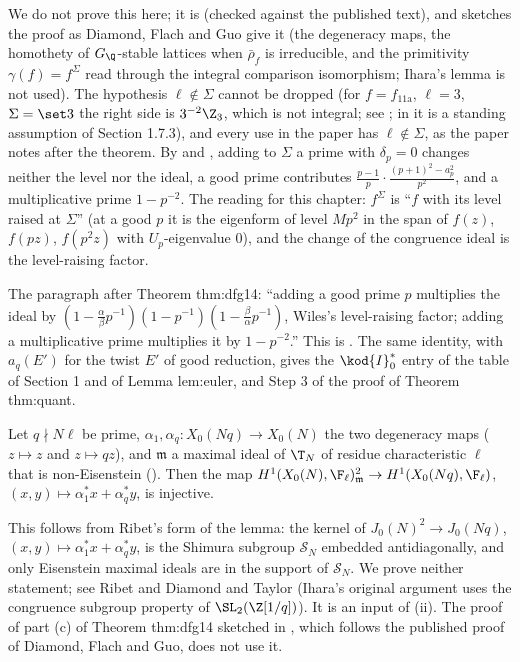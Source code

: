 We do not prove this here; it is \cite[Proposition 1.4(c)]{DFG04} (checked against the published text), and  sketches the proof as Diamond, Flach and Guo give it
(the degeneracy maps, the homothety of $G_\Q$-stable lattices when $\bar\rho_f$ is irreducible, and the primitivity $\gamma(f)=f^\Sigma$ read through the integral comparison isomorphism; Ihara's
lemma is not used). The hypothesis
$\ell\notin\Sigma$ cannot be dropped (for $f=f_{\text{11a}}$, $\ell=3$, $\Sigma=\set3$ the right side is $3^{-2}\Z_3$, which is not integral; see ; in \cite{DFG04} it is a standing assumption of Section 1.7.3), and
every use in the paper has $\ell\notin\Sigma$, as the paper notes after the theorem. By  and , adding to $\Sigma$ a prime with $\delta_p=0$ changes neither the level nor
the ideal, a good prime contributes $\frac{p-1}p\cdot\frac{(p+1)^2-a_p^2}{p^2}$, and a multiplicative prime $1-p^{-2}$. The reading for this chapter: $f^\Sigma$ is ``$f$ with its level
raised at $\Sigma$'' (at a good $p$ it is the eigenform of level $Mp^2$ in the span of $f(z)$, $f(pz)$, $f(p^2z)$ with $U_p$-eigenvalue $0$), and the change of the
congruence ideal is the level-raising factor.

\begin{paperlink}
The paragraph after Theorem thm:dfg14: ``adding a good prime $p$ multiplies the ideal by $(1-\frac\alpha\beta p^{-1})(1-p^{-1})(1-\frac\beta\alpha p^{-1})$, Wiles's level-raising
factor; adding a multiplicative prime multiplies it by $1-p^{-2}$.'' This is . The same identity, with $a_q(E')$ for the
twist $E'$ of good reduction, gives the $\kod{I}_0^*$ entry of the table of Section 1 and of Lemma lem:euler, and Step 3 of the proof of Theorem thm:quant.
\end{paperlink}

\begin{lemma}\label{lem:modgalrep:ihara}
Let $q\nmid N\ell$ be prime, $\alpha_1,\alpha_q\colon X_0(Nq)\to X_0(N)$ the two degeneracy maps ($z\mapsto z$ and $z\mapsto qz$), and $\mathfrak m$ a maximal ideal of $\T_N$ of residue
characteristic $\ell$ that is non-Eisenstein (). Then the map $H^1(X_0(N),\F_\ell)^2_{\mathfrak m}\to H^1(X_0(Nq),\F_\ell)$, $(x,y)\mapsto\alpha_1^*x+\alpha_q^*y$, is
injective.
\end{lemma}

This follows from Ribet's form of the lemma: the kernel of $J_0(N)^2\to J_0(Nq)$, $(x,y)\mapsto\alpha_1^*x+\alpha_q^*y$, is the Shimura subgroup $\mathcal S_N$ embedded
antidiagonally, and only Eisenstein maximal ideals are in the support of $\mathcal S_N$. We prove neither statement; see Ribet \cite{Ribet84} and Diamond and Taylor \cite{DiamondTaylor94} (Ihara's original argument uses the congruence
subgroup property of $\SL_2(\Z[1/q])$). It is an input of (ii). The proof of part (c) of Theorem thm:dfg14 sketched in , which follows the published proof of
Diamond, Flach and Guo, does not use it.


